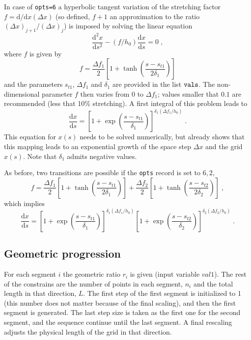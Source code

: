 In case of {\tt opts=6} a hyperbolic tangent variation of the stretching factor
$f=\mathrm{d}/\mathrm{d}x (\Delta x)$ (so defined, $f+1$ an approximation to the ratio $(\Delta x)
_{j+1}/(\Delta x) _{j} $) is imposed by solving the linear equation
\begin{equation}
\frac{\mathrm{d}^2x}{\mathrm{d}s^2} - (f/h_0)\frac{\mathrm{d}x}{\mathrm{d}s} = 0 \;,
\end{equation}
where $f$ is given by
\begin{equation}
f = \frac{\Delta f_1}{2}\left[ 1 + \tanh\left(\frac{s-s_{t1}}{2\delta_1}\right)\right]
\end{equation}
and the parameters $s_{t1}$, $\Delta f_1$ and $\delta_1$ are provided in the list
${\tt vals}$. The non-dimensional parameter $f$ then varies from $0$ to $\Delta
f_1$; values smaller that $0.1$ are recommended (less that 10\% stretching). A
first integral of this problem leads to
\begin{equation}
\frac{\mathrm{d}x}{\mathrm{d}s} =
\left[1+\exp\left(\frac{s-s_{t1}}{\delta_1}\right)\right]^{\delta_1(\Delta f_1/h_0)} \;.
\end{equation}
This equation for $x(s)$ needs to be solved numerically, but already shows that
this mapping leads to an exponential growth of the space step $\Delta x$ and the
grid $x(s)$. Note that $\delta_1$ admits negative values.

As before, two transitions are possible if the {\tt opts} record is set to $6,2$,
\begin{equation}
  f = \frac{\Delta f_1}{2}\left[ 1 + \tanh\left(\frac{s-s_{t1}}{2\delta_1}\right)\right]
  + \frac{\Delta f_2}{2}\left[ 1 + \tanh\left(\frac{s-s_{t2}}{2\delta_2}\right)\right] \;,
\end{equation}
which implies
\begin{equation}
  \frac{\mathrm{d}x}{\mathrm{d}s} =
  \left[1+\exp\left(\frac{s-s_{t1}}{\delta_1}\right)\right]^{\delta_1(\Delta f_1/h_0)}
  \left[1+\exp\left(\frac{s-s_{t2}}{\delta_2}\right)\right]^{\delta_2(\Delta f_2/h_0)}\;.
\end{equation}

\subsection{Geometric progression}
For each segment $i$ the geometric ratio $r_i$ is given (input variable
$val1$). The rest of the constrains are the number of points in each segment,
$n_i$ and the total length in that direction, $L$.  The first step of the first
segment is initialized to 1 (this number does not matter because of the final
scaling), and then the first segment is generated. The last step size is taken
as the first one for the second segment, and the sequence continue until the
last segment. A final rescaling adjusts the physical length of the grid in that
direction.

